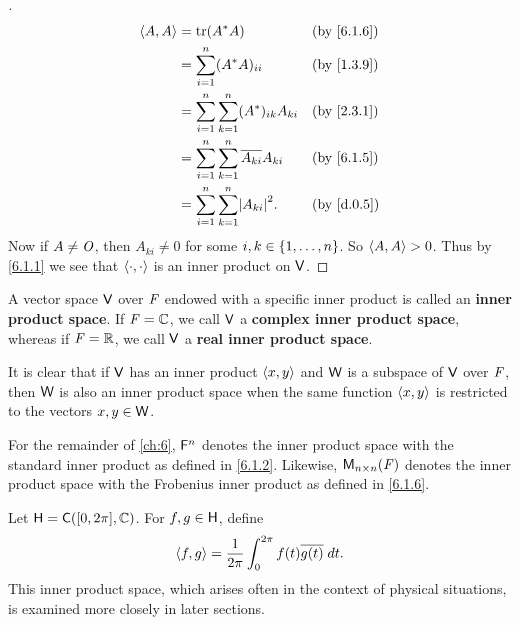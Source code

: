 \begin{proof}[]
\begin{align*}
    \inn{A, A} & = \tr(A^* A)                                           &  & \by{6.1.6} \\
               & = \sum_{i = 1}^n (A^* A)_{i i}                         &  & \by{1.3.9} \\
               & = \sum_{i = 1}^n \sum_{k = 1}^n (A^*)_{i k} A_{k i}    &  & \by{2.3.1} \\
               & = \sum_{i = 1}^n \sum_{k = 1}^n \conj{A_{k i}} A_{k i} &  & \by{6.1.5} \\
               & = \sum_{i = 1}^n \sum_{k = 1}^n \abs{A_{k i}}^2.       &  & \by{d.0.5}
  \end{align*}
  Now if \(A \neq \mathit{O}\), then \(A_{k i} \neq 0\) for some \(i, k \in \left\lbrace1, \dots, n\right\rbrace\).
  So \(\left\langle A, A\right\rangle > 0\).
  Thus by \cref{6.1.1} we see that \(\left\langle\cdot, \cdot\right\rangle\) is an inner product on \(\mathsf{V}\).
\end{proof}

\begin{defn}\label{6.1.7}
  A vector space \(\mathsf{V}\) over \(\mathit{F}\) endowed with a specific inner product is called an \textbf{inner product space}.
  If \(\mathit{F} = \mathbb{C}\), we call \(\mathsf{V}\) a \textbf{complex inner product space}, whereas if \(\mathit{F} = \mathbb{R}\), we call \(\mathsf{V}\) a \textbf{real inner product space}.

  It is clear that if \(\mathsf{V}\) has an inner product \(\left\langle x, y\right\rangle\) and \(\mathsf{W}\) is a subspace of \(\mathsf{V}\) over \(\mathit{F}\), then \(\mathsf{W}\) is also an inner product space when the same function \(\left\langle x, y\right\rangle\) is restricted to the vectors \(x, y \in \mathsf{W}\).
\end{defn}

\begin{note}
  For the remainder of \cref{ch:6}, \(\mathsf{F}^n\) denotes the inner product space with the standard inner product as defined in \cref{6.1.2}.
  Likewise, \(\ms[n][n][\F]\) denotes the inner product space with the Frobenius inner product as defined in \cref{6.1.6}.
\end{note}

\begin{eg}\label{6.1.8}
  Let \(\vs{H} = \cfs([0, 2 \pi], \C)\).
  For \(f, g \in \mathsf{H}\), define
  \[
    \left\langle f, g\right\rangle = \frac{1}{2 \pi} \int_0^{2 \pi} f(t) \overline{g(t)} \; dt.
  \]
  This inner product space, which arises often in the context of physical situations, is examined more closely in later sections.
\end{eg}

